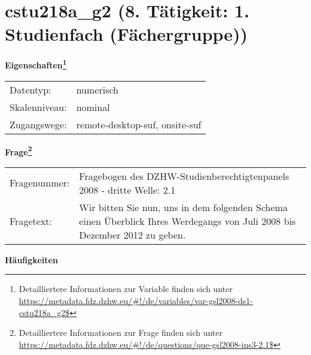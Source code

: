 
    \setcounter{footnote}{0}

    \vspace*{-1.8cm}
	\section{cstu218a\_g2 (8. Tätigkeit: 1. Studienfach (Fächergruppe))}
	\label{section:cstu218a_g2}



    \vspace*{0.5cm}
    \noindent\textbf{Eigenschaften\footnote{Detailliertere Informationen zur Variable finden sich unter
		\url{https://metadata.fdz.dzhw.eu/\#!/de/variables/var-gsl2008-ds1-cstu218a_g2$}}}\\
	\begin{tabularx}{\hsize}{@{}lX}
	Datentyp: & numerisch \\
	Skalenniveau: & nominal \\
	Zugangswege: &
	  remote-desktop-suf, 
	  onsite-suf
 \\
    \end{tabularx}



				\vspace*{0.5cm}
                \noindent\textbf{Frage\footnote{Detailliertere Informationen zur Frage finden sich unter
		              \url{https://metadata.fdz.dzhw.eu/\#!/de/questions/que-gsl2008-ins3-2.1$}}}\\
				\begin{tabularx}{\hsize}{@{}lX}
					Fragenummer: &
					  Fragebogen des DZHW-Studienberechtigtenpanels 2008 - dritte Welle:
					  2.1
 \\
					Fragetext: & Wir bitten Sie nun, uns in dem folgenden Schema einen Überblick Ihres Werdegangs von Juli 2008 bis Dezember 2012 zu geben. \\
				\end{tabularx}





        		\vspace*{0.5cm}
                \noindent\textbf{Häufigkeiten}

